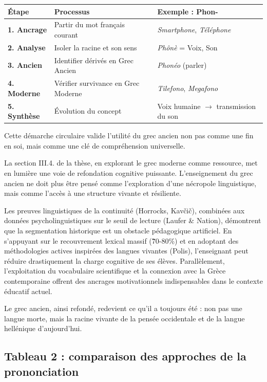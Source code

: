 \begin{table}[h!]\small\centering\begin{tabular}{| p{2cm} | p{3.5cm} | p{3.5cm} |}\hline\textbf{Étape} & \textbf{Processus} & \textbf{Exemple : Phon-} \\ \hline\textbf{1. Ancrage} & Partir du mot français courant & \textit{Smartphone}, \textit{Téléphone} \\ \hline\textbf{2. Analyse} & Isoler la racine et son sens & \textit{Phônè} = Voix, Son \\ \hline\textbf{3. Ancien} & Identifier dérivés en Grec Ancien & \textit{Phonéo} (parler) \\ \hline\textbf{4. Moderne} & Vérifier survivance en Grec Moderne & \textit{Tilefono}, \textit{Megafono} \\ \hline\textbf{5. Synthèse} & Évolution du concept & Voix humaine $\to$ transmission du son \\ \hline\end{tabular}\end{table}Cette démarche circulaire valide l'utilité du grec ancien non pas comme une fin en soi, mais comme
une clé de compréhension universelle.

La section III.4.\cite{ref2} de la thèse, en explorant le grec moderne comme ressource, met en
lumière une voie de refondation cognitive puissante. L'enseignement du grec ancien ne doit plus être
pensé comme l'exploration d'une nécropole linguistique, mais comme l'accès à une structure vivante
et résiliente.

Les preuves linguistiques de la continuité (Horrocks, Kavčič), combinées aux données
psycholinguistiques sur le seuil de lecture (Laufer \& Nation), démontrent que la segmentation
historique est un obstacle pédagogique artificiel. En s'appuyant sur le recouvrement lexical massif
(\~70-80\%) et en adoptant des méthodologies actives inspirées des langues vivantes (Polis),
l'enseignant peut réduire drastiquement la charge cognitive de ses élèves. Parallèlement,
l'exploitation du vocabulaire scientifique et la connexion avec la Grèce contemporaine offrent des
ancrages motivationnels indispensables dans le contexte éducatif actuel.

Le grec ancien, ainsi \og refondé\fg{}, redevient ce qu'il a toujours été : non pas une langue
morte, mais la racine vivante de la pensée occidentale et de la langue hellénique d'aujourd'hui.



\subsection{Tableau 2 : comparaison des approches de la prononciation}

